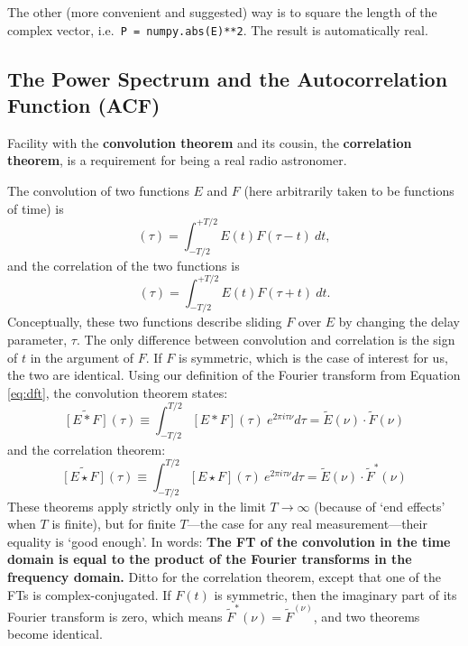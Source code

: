 \documentclass[12pt,preprint]{aastex}
\begin{document}
The other (more convenient and suggested) way is to square the length of
the complex vector, i.e.\ \verb$P = numpy.abs(E)**2$. The result is
automatically real.


\subsection{The Power Spectrum and the Autocorrelation Function
  (ACF)} \label{acf}

Facility with the {\bf convolution theorem} and its cousin,
the {\bf correlation theorem}, 
is a requirement for being a real radio astronomer. 

The convolution of two functions $E$ and $F$ (here arbitrarily taken
to be functions of time) is
%
\begin{equation}
[E * F](\tau) = \int_{-T/2}^{+T/2} E(t) F(\tau - t) \ dt,
\end{equation}
%
and the correlation of the two functions is
%
\begin{equation}
[E\star F](\tau) = \int_{-T/2}^{+T/2} E(t) F(\tau + t) \ dt.
\end{equation}
%
\noindent Conceptually, these two functions describe sliding $F$ over
$E$ by changing the delay parameter, $\tau$.
The only difference between convolution and correlation is the sign of $t$ in the argument of
$F$. If $F$ is symmetric, which is the case of interest for us, the two
are identical. Using our definition of the Fourier transform from
Equation \ref{eq:dft}, the convolution theorem states:
%
\begin{equation}
\widetilde{[E*F]}(\tau)\equiv\int_{-T/2}^{T/2} [E*F](\tau)~e^{2\pi i \tau\nu} d\tau =
    \tilde E(\nu) \cdot \tilde F(\nu)
\end{equation}
%
and the correlation theorem:
\begin{equation}
\widetilde{[E\star F]}(\tau)\equiv\int_{-T/2}^{T/2} [E\star F](\tau)~e^{2\pi i \tau\nu} d\tau =
    \tilde E(\nu) \cdot \tilde F^*(\nu)
\label{eq:acfpwr}
\end{equation}
%
These theorems apply
strictly only in the limit $T \rightarrow \infty$ (because of `end
effects' when $T$ is finite), but for finite $T$---the case for any real
measurement---their equality is `good enough'. In words: {\bf The FT of
  the convolution in the time domain is equal to the product of the
  Fourier transforms in the frequency domain.} Ditto for the correlation
theorem, except that one of the FTs is complex-conjugated.  If $F(t)$ is
symmetric, then the imaginary part of its Fourier transform is zero,
which means $\tilde F^*(\nu) = \tilde F^(\nu)$, and two theorems become
identical.
\end{document}

